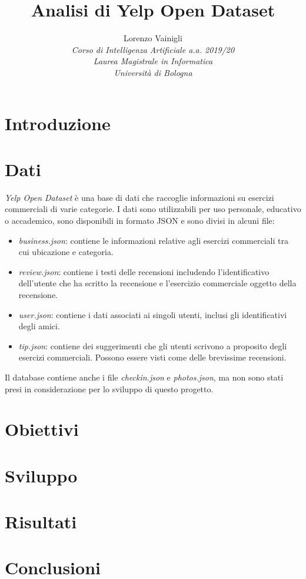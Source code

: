 \documentclass[12pt]{article}
\title{Analisi di Yelp Open Dataset}
\author{
        Lorenzo Vainigli\\
        \textit{\small Corso di Intelligenza Artificiale a.a. 2019/20}\\
        \textit{\small Laurea Magistrale in Informatica}\\
        \textit{\small Università di Bologna}
}
\date{}
\begin{document}
\maketitle

\section{Introduzione}

\section{Dati}
\textit{Yelp Open Dataset} \cite{yelp} è una base di dati che raccoglie informazioni su esercizi commerciali di varie categorie. I dati sono utilizzabili per uso personale, educativo o accademico, sono disponibili in formato JSON e sono divisi in alcuni file:
\begin{itemize}
\item \textit{business.json}: contiene le informazioni relative agli esercizi commerciali tra cui ubicazione e categoria.
\item \textit{review.json}: contiene i testi delle recensioni includendo l'identificativo dell'utente che ha scritto la recensione e l'esercizio commerciale oggetto della recensione.
\item \textit{user.json}: contiene i dati associati ai singoli utenti, inclusi gli identificativi degli amici.
\item \textit{tip.json}: contiene dei suggerimenti che gli utenti scrivono a proposito degli esercizi commerciali. Possono essere visti come delle brevissime recensioni.
\end{itemize}
Il database contiene anche i file \textit{checkin.json} e \textit{photos.json}, ma non sono stati presi in considerazione per lo sviluppo di questo progetto.

\section{Obiettivi}

\section{Sviluppo}

\section{Risultati}

\section{Conclusioni}

\printbibliography[title={Riferimenti}]
\end{document}
